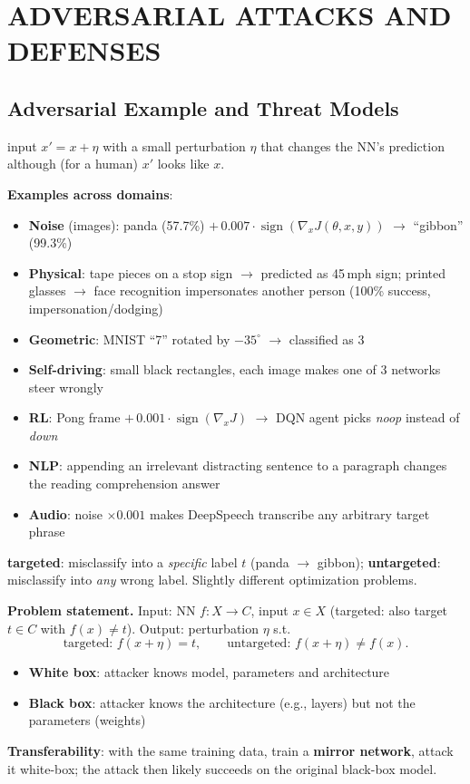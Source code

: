 \section{ADVERSARIAL ATTACKS AND DEFENSES}

\subsection{Adversarial Example and Threat Models}
 input $x' = x + \eta$ with a small perturbation $\eta$ that changes the
NN's prediction although (for a human) $x'$ looks like $x$.

\textbf{Examples across domains}:
\begin{itemize}
  \item \textbf{Noise} (images): panda (57.7\%) $+\,0.007\cdot\operatorname{sign}(\nabla_x J(\theta,x,y))$ $\to$ ``gibbon'' (99.3\%)
  \item \textbf{Physical}: tape pieces on a stop sign $\to$ predicted as 45\,mph sign; printed glasses
    $\to$ face recognition impersonates another person (100\% success, impersonation/dodging)
  \item \textbf{Geometric}: MNIST ``7'' rotated by $-35^\circ$ $\to$ classified as 3
  \item \textbf{Self-driving}: small black rectangles, each image makes one of 3 networks steer wrongly
  \item \textbf{RL}: Pong frame $+\,0.001\cdot\operatorname{sign}(\nabla_x J)$ $\to$ DQN agent picks \emph{noop} instead of \emph{down}
  \item \textbf{NLP}: appending an irrelevant distracting sentence to a paragraph changes the reading comprehension answer
  \item \textbf{Audio}: noise $\times 0.001$ makes DeepSpeech transcribe any arbitrary target phrase
\end{itemize}

\textbf{targeted}: misclassify into a \emph{specific} label $t$ (panda $\to$ gibbon);
\textbf{untargeted}: misclassify into \emph{any} wrong label. Slightly different optimization problems.

\textbf{Problem statement.} Input: NN $f: X \to C$, input $x \in X$ (targeted: also target $t \in C$ with $f(x) \neq t$).
Output: perturbation $\eta$ s.t.
\[
  \text{targeted: } f(x+\eta) = t, \qquad \text{untargeted: } f(x+\eta) \neq f(x).
\]

\begin{itemize}
  \item \textbf{White box}: attacker knows model, parameters and architecture
  \item \textbf{Black box}: attacker knows the architecture (e.g., layers) but not the parameters (weights)
\end{itemize}
\textbf{Transferability}: with the same training data, train a \textbf{mirror network}, attack it white-box;
the attack then likely succeeds on the original black-box model.


